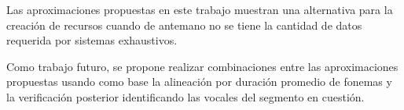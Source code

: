 Las aproximaciones propuestas en este trabajo muestran una alternativa para la creación de recursos cuando de antemano no se tiene la cantidad de datos requerida por sistemas exhaustivos.

Como trabajo futuro, se propone realizar combinaciones entre las aproximaciones propuestas usando como base la alineación por duración promedio de fonemas y la verificación posterior identificando las vocales del segmento en cuestión.
